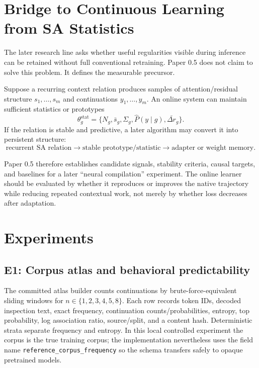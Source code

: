 \documentclass[10pt]{article}
\begin{document}
\section{Bridge to Continuous Learning from SA Statistics}
The later research line asks whether useful regularities visible during inference can be retained without full conventional retraining. Paper 0.5 does not claim to solve this problem. It defines the measurable precursor.

Suppose a recurring context relation produces samples of attention/residual structure $s_1,\ldots,s_m$ and continuations $y_1,\ldots,y_m$. An online system can maintain sufficient statistics or prototypes
\begin{equation}
 \theta_g^{\mathrm{stat}}=\{N_g,\bar s_g,\Sigma_g,\hat P(y\mid g),\bar{\Delta r}_g\}.
\end{equation}
If the relation is stable and predictive, a later algorithm may convert it into persistent structure:
\begin{equation}
 \text{recurrent SA relation}\rightarrow
 \text{stable prototype/statistic}\rightarrow
 \text{adapter or weight memory}.
\end{equation}

Paper 0.5 therefore establishes candidate signals, stability criteria, causal targets, and baselines for a later ``neural compilation'' experiment. The online learner should be evaluated by whether it reproduces or improves the native trajectory while reducing repeated contextual work, not merely by whether loss decreases after adaptation.

\section{Experiments}
\subsection{E1: Corpus atlas and behavioral predictability}
The committed atlas builder counts continuations by brute-force-equivalent sliding windows for $n\in\{1,2,3,4,5,8\}$. Each row records token IDs, decoded inspection text, exact frequency, continuation counts/probabilities, entropy, top probability, log association ratio, source/split, and a content hash. Deterministic strata separate frequency and entropy. In this local controlled experiment the corpus is the true training corpus; the implementation nevertheless uses the field name \texttt{reference\_corpus\_frequency} so the schema transfers safely to opaque pretrained models.
\end{document}
